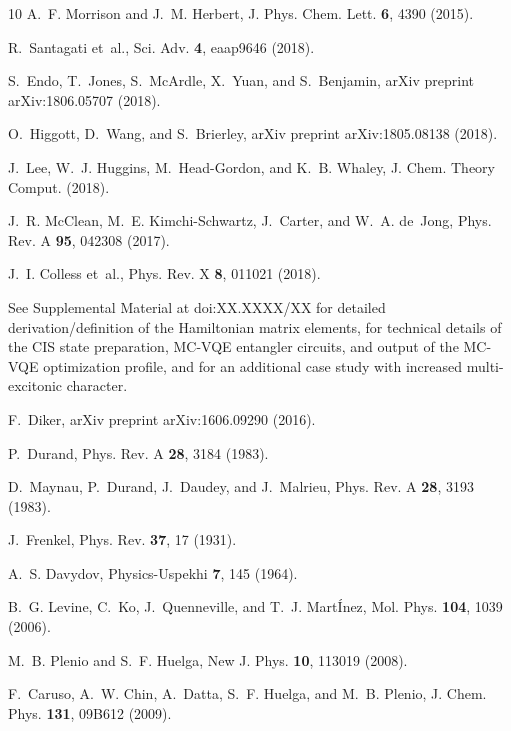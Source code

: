 \documentclass[aps,prl,twocolumn,showpacs,superscriptaddress,groupedaddress]{revtex4}  %
\begin{document}
\begin{thebibliography}{10}
A.~F. Morrison and J.~M. Herbert,
\newblock J. Phys. Chem. Lett. {\bf 6}, 4390 (2015).

R.~Santagati et~al.,
\newblock Sci. Adv. {\bf 4}, eaap9646 (2018).

S.~Endo, T.~Jones, S.~McArdle, X.~Yuan, and S.~Benjamin,
\newblock arXiv preprint arXiv:1806.05707  (2018).

O.~Higgott, D.~Wang, and S.~Brierley,
\newblock arXiv preprint arXiv:1805.08138  (2018).

J.~Lee, W.~J. Huggins, M.~Head-Gordon, and K.~B. Whaley,
\newblock J. Chem. Theory Comput.  (2018).

J.~R. McClean, M.~E. Kimchi-Schwartz, J.~Carter, and W.~A. de~Jong,
\newblock Phys. Rev. A {\bf 95}, 042308 (2017).

J.~I. Colless et~al.,
\newblock Phys. Rev. X {\bf 8}, 011021 (2018).

See Supplemental Material at doi:XX.XXXX/XX for detailed derivation/definition
  of the Hamiltonian matrix elements, for technical details of the CIS state
  preparation, MC-VQE entangler circuits, and output of the MC-VQE optimization
  profile, and for an additional case study with increased multi-excitonic
  character.

F.~Diker,
\newblock arXiv preprint arXiv:1606.09290  (2016).

P.~Durand,
\newblock Phys. Rev. A {\bf 28}, 3184 (1983).

D.~Maynau, P.~Durand, J.~Daudey, and J.~Malrieu,
\newblock Phys. Rev. A {\bf 28}, 3193 (1983).

J.~Frenkel,
\newblock Phys. Rev. {\bf 37}, 17 (1931).

A.~S. Davydov,
\newblock Physics-Uspekhi {\bf 7}, 145 (1964).

B.~G. Levine, C.~Ko, J.~Quenneville, and T.~J. Mart{\'I}nez,
\newblock Mol. Phys. {\bf 104}, 1039 (2006).

M.~B. Plenio and S.~F. Huelga,
\newblock New J. Phys. {\bf 10}, 113019 (2008).

F.~Caruso, A.~W. Chin, A.~Datta, S.~F. Huelga, and M.~B. Plenio,
\newblock J. Chem. Phys. {\bf 131}, 09B612 (2009).


\end{thebibliography}
\end{document}
